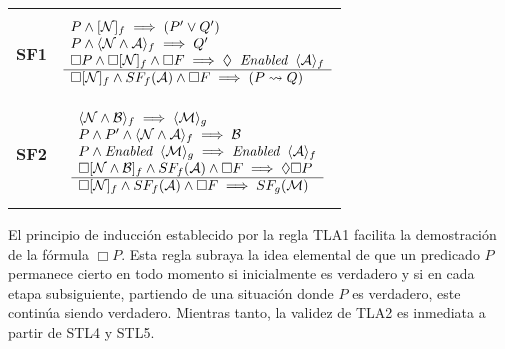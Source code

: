 \vspace{0.25cm}
\begin{tabular}{ll}
    \textbf{SF1} & 
    \begin{minipage}{0.5\linewidth}
    \begin{equation*}
    \begin{array}{l}
        P \land [\mathcal{N}]_f \implies (P' \lor Q') \\
        P \land \langle \mathcal{N} \land \mathcal{A} \rangle_f \implies Q' \\
        \Box P \land \Box [\mathcal{N}]_f \land \Box F \implies \Diamond \hspace{0.2cm} \textit{Enabled} \hspace{0.2cm} \langle \mathcal{A} \rangle_f \\
        \hline
        \Box[\mathcal{N}]_f \land SF_f(\mathcal{A}) \land \Box F \implies (P \leadsto Q)
    \end{array}
    \end{equation*}
    \end{minipage} \\[10pt]
    \textbf{SF2} & 
    \begin{minipage}{0.5\linewidth}
    \begin{equation*}
    \begin{array}{l}
        \langle \mathcal{N} \land \mathcal{B} \rangle_f \implies \langle \mathcal{M} \rangle_g \\
        P \land P' \land \langle \mathcal{N} \land \mathcal{A} \rangle_f \implies \mathcal{B} \\
        P \land \textit{Enabled} \hspace{0.2cm} \langle \mathcal{M} \rangle_g \implies \textit{Enabled} \hspace{0.2cm} \langle \mathcal{A} \rangle_f \\
        \Box [\mathcal{N} \land \mathcal{B}]_f \land SF_f(\mathcal{A}) \land \Box F \implies \Diamond \Box P \\
        \hline
        \Box[\mathcal{N}]_f \land SF_f(\mathcal{A}) \land \Box F \implies SF_g(\mathcal{M})
    \end{array}
    \end{equation*}
    \end{minipage}
\end{tabular}

\newpage
El principio de inducción establecido por la regla TLA1 facilita la demostración de la fórmula $\Box P$. Esta regla subraya la idea elemental de que un predicado $P$ permanece cierto en todo momento si inicialmente es verdadero y si en cada etapa subsiguiente, partiendo de una situación donde $P$ es verdadero, este continúa siendo verdadero. Mientras tanto, la validez de TLA2 es inmediata a partir de STL4 y STL5.

